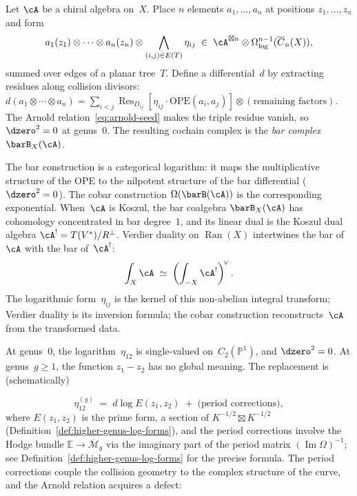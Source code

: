 Let $\cA$ be a chiral algebra on~$X$.  Place $n$ elements
$a_1, \ldots, a_n$ at positions $z_1, \ldots, z_n$ and form
\begin{equation}\label{eq:bar-element-intro}
a_1(z_1) \otimes \cdots \otimes a_n(z_n)
\otimes \bigwedge_{(i,j) \in E(T)} \eta_{ij}
\;\in\;
\cA^{\boxtimes n} \otimes
\Omega^{n-1}_{\log}(\overline{C}_n(X)),
\end{equation}
summed over edges of a planar tree~$T$.  Define a differential~$d$
by extracting residues along collision divisors:
$d(a_1 \otimes \cdots \otimes a_n) = \sum_{i < j}
\operatorname{Res}_{D_{ij}}[\eta_{ij} \cdot
\text{OPE}(a_i, a_j)] \otimes (\text{remaining factors})$.
The Arnold relation~\eqref{eq:arnold-seed} makes the triple
residue vanish, so $\dzero^2 = 0$ at genus~$0$.  The resulting cochain complex is
the \emph{bar complex}~$\barB_X(\cA)$.

The bar construction is a categorical logarithm: it maps the
multiplicative structure of the OPE to the nilpotent structure
of the bar differential ($\dzero^2 = 0$).  The cobar construction
$\Omega(\barB(\cA))$ is the corresponding exponential.
When~$\cA$ is Koszul, the bar coalgebra $\barB_X(\cA)$ has cohomology
concentrated in bar degree~$1$, and its linear dual is the Koszul dual
algebra $\cA^! = T(V^*)/R^\perp$.  Verdier duality on
$\operatorname{Ran}(X)$ intertwines the bar of~$\cA$ with the bar
of~$\cA^!$:
\begin{equation}\label{eq:NAP-intro}
\int_X \cA \;\simeq\;
\left(\int_{-X} \cA^!\right)^{\!\vee}.
\end{equation}
The logarithmic form~$\eta_{ij}$ is the kernel of this non-abelian
integral transform; Verdier duality is its inversion formula;
the cobar construction reconstructs~$\cA$ from the transformed data.

At genus~$0$, the logarithm~$\eta_{12}$ is single-valued
on~$C_2(\mathbb{P}^1)$, and $\dzero^2 = 0$.  At
genus~$g \geq 1$, the function $z_1 - z_2$ has no global meaning.
The replacement is (schematically)

\begin{equation}\label{eq:genus-g-propagator-intro-ch0}
\eta_{12}^{(g)} \;=\; d\log E(z_1, z_2)
\;+\; \text{(period corrections)},
\end{equation}
where $E(z_1,z_2)$ is the prime form, a section of $K^{-1/2} \boxtimes K^{-1/2}$
(Definition~\ref{def:higher-genus-log-forms}), and the period corrections
involve the Hodge bundle $\mathbb{E} \to \overline{\mathcal{M}}_g$
via the imaginary part of the period matrix
$(\operatorname{Im}\Omega)^{-1}$; see Definition~\ref{def:higher-genus-log-forms}
for the precise formula.
The period corrections couple the collision geometry to the complex
structure of the curve, and the Arnold relation acquires a defect:

